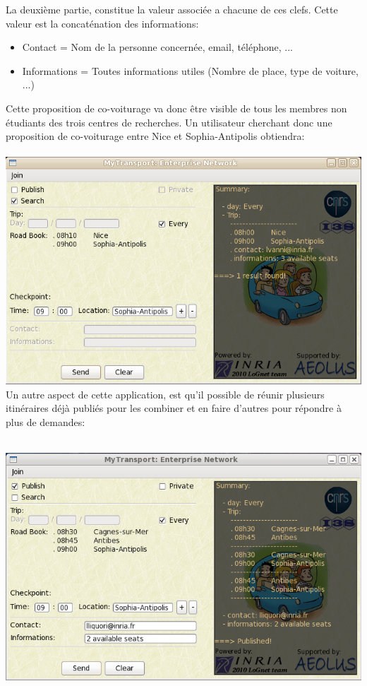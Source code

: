 La deuxième partie, constitue la valeur associée a chacune de ces clefs. Cette valeur est la concaténation des informations:
\begin{itemize}
\item Contact = Nom de la personne concernée, email, téléphone, ...
\item Informations = Toutes informations utiles (Nombre de place, type de voiture, ...) \\
\end{itemize}

Cette proposition de co-voiturage va donc être visible de tous les membres non étudiants des trois centres de recherches. Un utilisateur cherchant donc une proposition de co-voiturage entre Nice et Sophia-Antipolis obtiendra:\\

~ \includegraphics[scale=0.55]{img/screenshot/NiceSophiaSub}\\

Un autre aspect de cette application, est qu'il possible de réunir plusieurs itinéraires déjà publiés pour les combiner et en faire d'autres pour répondre à plus de demandes:

~ \includegraphics[scale=0.55]{img/screenshot/CagnesAntibesSophiaPub}\\

